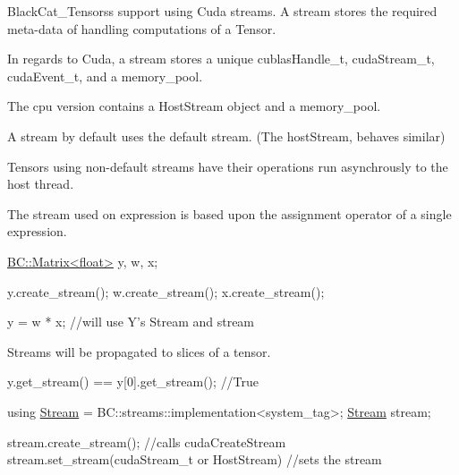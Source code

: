 Black\+Cat\+\_\+\+Tensors\textquotesingle{}s support using Cuda streams. A stream stores the required meta-\/data of handling computations of a Tensor.

In regards to Cuda, a stream stores a unique cublas\+Handle\+\_\+t, cuda\+Stream\+\_\+t, cuda\+Event\+\_\+t, and a memory\+\_\+pool.

The cpu version contains a Host\+Stream object and a memory\+\_\+pool.

A stream by default uses the default stream. (The host\+Stream, behaves similar)

Tensors using non-\/default streams have their operations run asynchrously to the host thread.

The stream used on expression is based upon the assignment operator of a single expression.


\begin{DoxyCode}
\hyperlink{classBC_1_1tensors_1_1Tensor__Base}{BC::Matrix<float>} y, w, x;

y.create\_stream();
w.create\_stream();
x.create\_stream();

y = w * x; \textcolor{comment}{//will use Y's Stream and stream }
\end{DoxyCode}


Streams will be propagated to slices of a tensor.


\begin{DoxyCode}
y.get\_stream() == y[0].get\_stream(); \textcolor{comment}{//True }
\end{DoxyCode}



\begin{DoxyCode}
\textcolor{keyword}{using} \hyperlink{namespaceBC_abc64a63cd29a22d102a68f478dfd588d}{Stream} = BC::streams::implementation<system\_tag>; 
\hyperlink{namespaceBC_abc64a63cd29a22d102a68f478dfd588d}{Stream} stream;

stream.create\_stream();         \textcolor{comment}{//calls cudaCreateStream}
stream.set\_stream(cudaStream\_t or HostStream)  \textcolor{comment}{//sets the stream }
\end{DoxyCode}
 